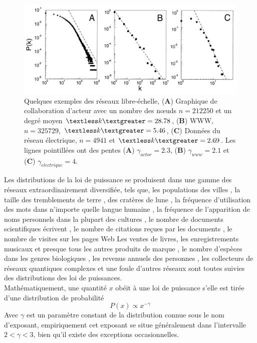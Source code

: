 \begin{figure}[h!]
\centering
\includegraphics[scale=0.3]{./figures/scal-free-reels}
\caption{Quelques exemples des réseaux libre-échelle, (\textbf{A}) Graphique de collaboration d'acteur avec un nombre des nœuds
$n=212250$ et un degré moyen $\textless k\textgreater=28.78$, (\textbf{B}) WWW, $n=325729$, $\textless k\textgreater=5.46$,
(\textbf{C}) Données du réseau électrique, $n=4941$ et $\textless k\textgreater=2.69$. Les lignes pointillées ont des pentes
(\textbf{A}) $\gamma_{actor}=2.3$, (\textbf{B}) $\gamma_{www}=2.1$ et (\textbf{C}) $\gamma_{electrique}=4$.}

\label{scal-free-reels}
\end{figure}
Les distributions de la loi de puissance se produisent dans une gamme des réseaux extraordinairement diversifiée, tels que, les populations des  villes \cite{New2005,Aa-al2009}, la taille des tremblements de terre \cite{GuR1944}, des cratères de lune  \cite{NeI1994}, la fréquence d'utilisation des mots dans n'importe quelle langue humaine \cite{Zipf1949,Estoup1916}, la  fréquence de l'apparition de noms personnels dans la plupart des cultures \cite{ZaM2001}, le nombre de documents scientifiques écrivent \cite{LoW1926}, le nombre de citations reçues par les documents \cite{Price1965}, le nombre de visites sur les pages Web \cite{AdH2000} Les ventes de livres, les enregistrements musicaux et presque tous les autres produits de marque \cite{Cox-al1995}, le nombre d'espèces dans les genres biologiques \cite{WilY1922}, les revenus annuels des personnes \cite{Pareto1896}, les collecteurs de réseaux quantiques complexes \cite{BiR2015} et une foule d'autres réseaux sont toutes suivies des distributions des loi de puissances.\\

Mathématiquement, une quantité $x$ obéit à une loi de puissance s'elle est tirée d'une distribution de probabilité
\begin{equation}
 P(x)\propto x^{-\gamma}
\end{equation}
Avec $\gamma$ est un paramètre constant de la distribution connue sous le nom d'exposant, empiriquement cet exposant se situe
généralement dans l'intervalle $2<\gamma<3$, bien qu'il existe des exceptions occasionnelles.

